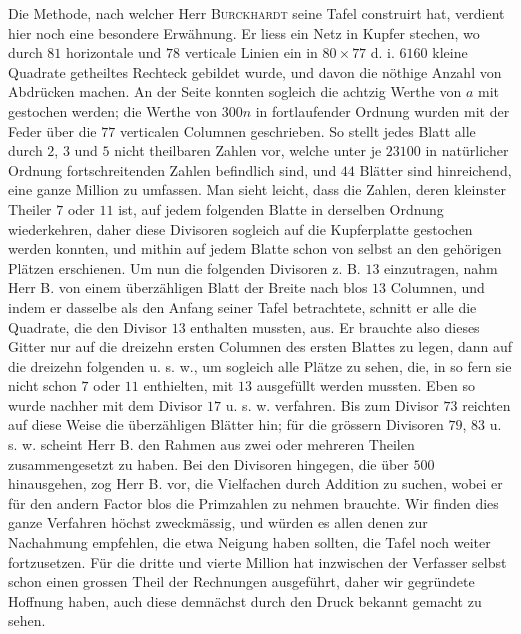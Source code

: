 Die Methode, nach welcher Herr \textsc{Burckhardt} seine Tafel construirt hat, verdient hier noch eine besondere Erwähnung. Er liess ein Netz in Kupfer stechen, wo durch $81$ horizontale und $78$ verticale Linien ein in $80\times77$ d. i. $6160$ kleine Quadrate getheiltes Rechteck gebildet wurde, und davon die nöthige Anzahl von Abdrücken machen. An der Seite konnten sogleich die achtzig Werthe
von $a$ mit gestochen werden; die Werthe von $300n$ in fortlaufender Ordnung wurden mit der Feder über die $77$ verticalen Columnen geschrieben. So stellt jedes Blatt alle durch $2$, $3$ und $5$ nicht theilbaren Zahlen vor, welche unter je $23100$ in natürlicher Ordnung fortschreitenden Zahlen befindlich sind, und $44$ Blätter sind hinreichend, eine ganze Million zu umfassen. Man sieht leicht, dass die Zahlen, deren kleinster Theiler $7$ oder $11$ ist, auf jedem folgenden Blatte in derselben Ordnung wiederkehren, daher diese Divisoren sogleich auf die Kupferplatte gestochen werden konnten, und mithin auf jedem Blatte schon von selbst an den gehörigen Plätzen erschienen. Um nun die folgenden Divisoren z. B. $13$ einzutragen, nahm Herr B. von einem überzähligen Blatt der Breite nach blos $13$ Columnen, und indem er dasselbe als den Anfang seiner Tafel betrachtete, schnitt er alle die Quadrate, die den Divisor $13$ enthalten mussten, aus. Er brauchte also dieses Gitter nur auf die dreizehn ersten Columnen des ersten Blattes zu legen, dann auf die dreizehn folgenden u. s. w., um sogleich alle Plätze zu sehen, die, in so fern sie nicht schon $7$ oder $11$ enthielten, mit $13$ ausgefüllt werden mussten. Eben so wurde nachher mit dem Divisor $17$ u. s. w. verfahren. Bis zum Divisor $73$ reichten auf diese Weise die überzähligen Blätter hin; für die grössern Divisoren $79$, $83$ u. s. w. scheint Herr B. den Rahmen aus zwei oder mehreren Theilen zusammengesetzt zu haben. Bei den Divisoren hingegen, die über $500$ hinausgehen, zog Herr B. vor, die Vielfachen durch Addition zu suchen, wobei er für den andern Factor blos die Primzahlen zu nehmen brauchte. Wir finden dies ganze Verfahren höchst zweckmässig, und würden es allen denen zur Nachahmung empfehlen, die etwa Neigung haben sollten, die Tafel noch weiter fortzusetzen. Für die dritte und vierte Million hat inzwischen der Verfasser selbst schon einen grossen Theil der Rechnungen ausgeführt, daher wir gegründete Hoffnung haben, auch diese demnächst durch den Druck bekannt gemacht zu sehen.

